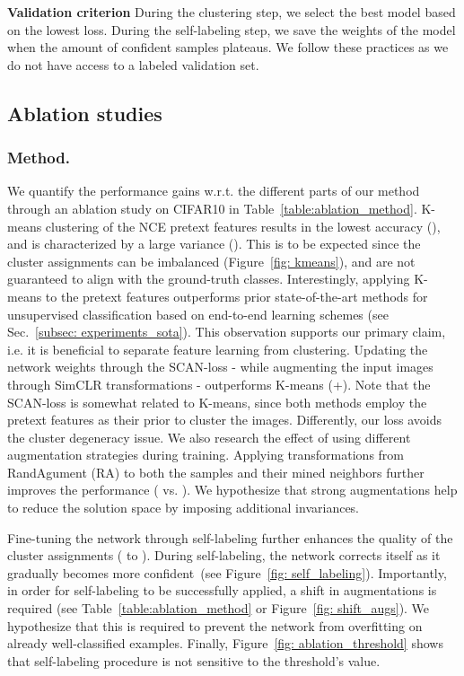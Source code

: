 \documentclass[runningheads]{llncs}
\begin{document}
\noindent\textbf{Validation criterion}
During the clustering step, we select the best model based on the lowest loss. During the self-labeling step, we save the weights of the model when the amount of confident samples plateaus. We follow these practices as we do not have access to a labeled validation set. 

\subsection{Ablation studies}
\label{subsec: experiments_ablation}

\subsubsection{Method.}

We quantify the performance gains w.r.t. the different parts of our method through an ablation study on CIFAR10 in Table~\ref{table:ablation_method}. K-means clustering of the NCE pretext features results in the lowest accuracy (), and is characterized by a large variance (). This is to be expected since the cluster assignments can be imbalanced (Figure~\ref{fig: kmeans}), and are not guaranteed to align with the ground-truth classes. Interestingly, applying K-means to the pretext features outperforms prior state-of-the-art methods for unsupervised classification based on end-to-end learning schemes (see Sec.~\ref{subsec: experiments_sota}). This observation supports our primary claim, i.e. it is beneficial to separate feature learning from clustering. Updating the network weights through the SCAN-loss - while augmenting the input images through SimCLR transformations - outperforms K-means (+). Note that the SCAN-loss is somewhat related to K-means, since both methods employ the pretext features as their prior to cluster the images. Differently, our loss avoids the cluster degeneracy issue. We also research the effect of using different augmentation strategies during training. Applying transformations from RandAgument (RA) to both the samples and their mined neighbors further improves the performance ( vs. ). We hypothesize that strong augmentations help to reduce the solution space by imposing additional invariances.

Fine-tuning the network through self-labeling further enhances the quality of the cluster assignments ( to ). During self-labeling, the network corrects itself as it gradually becomes more confident~(see Figure~\ref{fig: self_labeling}). Importantly, in order for self-labeling to be successfully applied, a shift in augmentations is required (see Table~\ref{table:ablation_method} or Figure~\ref{fig: shift_augs}). We hypothesize that this is required to prevent the network from overfitting on already well-classified examples. Finally, Figure~\ref{fig: ablation_threshold} shows that self-labeling procedure is not sensitive to the threshold's value.
\end{document}
